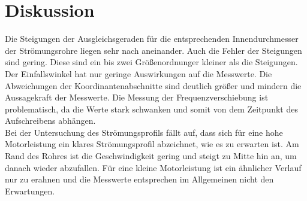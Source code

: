 \section{Diskussion}
\label{sec:Diskussion}
Die Steigungen der Ausgleichsgeraden für die entsprechenden Innendurchmesser der Strömungsrohre liegen sehr nach aneinander.
Auch die Fehler der Steigungen sind gering.
Diese sind ein bis zwei Größenordnunger kleiner als die Steigungen.
\\Der Einfallswinkel hat nur geringe Auswirkungen auf die Messwerte.
Die Abweichungen der Koordinantenabschnitte sind deutlich größer und mindern die Aussagekraft der Messwerte.
Die Messung der Frequenzverschiebung ist problematisch, da die Werte stark schwanken und somit von dem Zeitpunkt des Aufschreibens abhängen.
\\Bei der Untersuchung des Strömungsprofils fällt auf, dass sich für eine hohe Motorleistung ein klares Strömungsprofil abzeichnet, wie es zu erwarten ist.
Am Rand des Rohres ist die Geschwindigkeit gering und steigt zu Mitte hin an, um danach wieder abzufallen.
Für eine kleine Motorleistung ist ein ähnlicher Verlauf nur zu erahnen und die Messwerte entsprechen im Allgemeinen nicht den Erwartungen.

